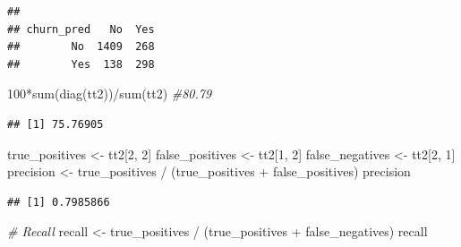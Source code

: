 \documentclass[
  twoside]{article}
\newenvironment{Shaded}{\begin{snugshade}}{\end{snugshade}}
\newcommand{\CommentTok}[1]{\textcolor[rgb]{0.56,0.35,0.01}{\textit{#1}}}
\newcommand{\DecValTok}[1]{\textcolor[rgb]{0.00,0.00,0.81}{#1}}
\newcommand{\FunctionTok}[1]{\textcolor[rgb]{0.00,0.00,0.00}{#1}}
\newcommand{\NormalTok}[1]{#1}
\newcommand{\OtherTok}[1]{\textcolor[rgb]{0.56,0.35,0.01}{#1}}
\newcommand{\SpecialCharTok}[1]{\textcolor[rgb]{0.00,0.00,0.00}{#1}}
\begin{document}
\begin{Shaded}
\end{Shaded}

\begin{verbatim}
##           
## churn_pred   No  Yes
##        No  1409  268
##        Yes  138  298
\end{verbatim}

\begin{Shaded}
\begin{Highlighting}[]
\DecValTok{100}\SpecialCharTok{*}\FunctionTok{sum}\NormalTok{(}\FunctionTok{diag}\NormalTok{(tt2))}\SpecialCharTok{/}\FunctionTok{sum}\NormalTok{(tt2) }\CommentTok{\#80.79}
\end{Highlighting}
\end{Shaded}

\begin{verbatim}
## [1] 75.76905
\end{verbatim}

\begin{Shaded}
\begin{Highlighting}[]
\NormalTok{true\_positives }\OtherTok{\textless{}{-}}\NormalTok{ tt2[}\DecValTok{2}\NormalTok{, }\DecValTok{2}\NormalTok{]}
\NormalTok{false\_positives }\OtherTok{\textless{}{-}}\NormalTok{ tt2[}\DecValTok{1}\NormalTok{, }\DecValTok{2}\NormalTok{]}
\NormalTok{false\_negatives }\OtherTok{\textless{}{-}}\NormalTok{ tt2[}\DecValTok{2}\NormalTok{, }\DecValTok{1}\NormalTok{]}
\NormalTok{precision }\OtherTok{\textless{}{-}}\NormalTok{ true\_positives }\SpecialCharTok{/}\NormalTok{ (true\_positives }\SpecialCharTok{+}\NormalTok{ false\_positives)}
\NormalTok{precision}
\end{Highlighting}
\end{Shaded}

\begin{verbatim}
## [1] 0.7985866
\end{verbatim}

\begin{Shaded}
\begin{Highlighting}[]
\CommentTok{\# Recall}
\NormalTok{recall }\OtherTok{\textless{}{-}}\NormalTok{ true\_positives }\SpecialCharTok{/}\NormalTok{ (true\_positives }\SpecialCharTok{+}\NormalTok{ false\_negatives)}
\NormalTok{recall}
\end{Highlighting}
\end{Shaded}
\end{document}
